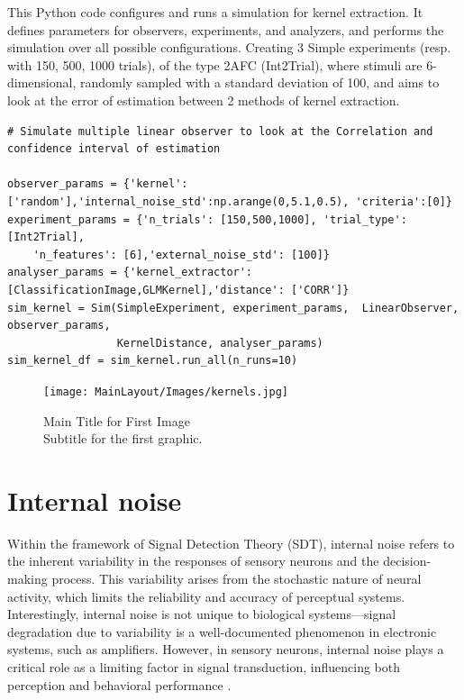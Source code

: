 \begin{tcolorbox}[title=Palin Toolbox: Kernel estimation error,
    colback=white!30!white, colframe=blue!80!white]
This Python code configures and runs a simulation for kernel extraction. It defines parameters for observers, experiments, and analyzers, and performs the simulation over all possible configurations. Creating 3 Simple experiments (resp. with 150, 500, 1000 trials), of the type 2AFC (Int2Trial), where stimuli are 6-dimensional, randomly sampled with a standard deviation of 100, and aims to look at the error of estimation between 2 methods of kernel extraction.
\tcblower

\begin{verbatim}
# Simulate multiple linear observer to look at the Correlation and confidence interval of estimation

observer_params = {'kernel':['random'],'internal_noise_std':np.arange(0,5.1,0.5), 'criteria':[0]}
experiment_params = {'n_trials': [150,500,1000], 'trial_type': [Int2Trial], 
    'n_features': [6],'external_noise_std': [100]}
analyser_params = {'kernel_extractor': [ClassificationImage,GLMKernel],'distance': ['CORR']}
sim_kernel = Sim(SimpleExperiment, experiment_params,  LinearObserver, observer_params, 
                 KernelDistance, analyser_params)
sim_kernel_df = sim_kernel.run_all(n_runs=10)
\end{verbatim}
\end{tcolorbox}
\begin{figure}[ht!]
    \centering
    \texttt{[image: MainLayout/Images/kernels.jpg]}
    \caption{Main Title for First Image \\ \small Subtitle for the first graphic.}
    \label{fig:kernels}
\end{figure}

\section {Internal noise}
Within the framework of Signal Detection Theory (SDT), internal noise refers to the inherent variability in the responses of sensory neurons and the decision-making process. This variability arises from the stochastic nature of neural activity, which limits the reliability and accuracy of perceptual systems. Interestingly, internal noise is not unique to biological systems—signal degradation due to variability is a well-documented phenomenon in electronic systems, such as amplifiers. However, in sensory neurons, internal noise plays a critical role as a limiting factor in signal transduction, influencing both perception and behavioral performance \cite{faisal_noise_2008}.


